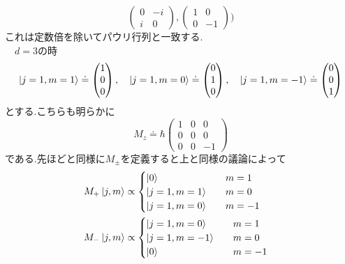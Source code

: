 \documentclass[uplatex,dvipdfmx, a4paper,11pt]{jsarticle}
\begin{document}
\begin{enumerate}[1.]
\begin{enumerate}[1）]
\begin{equation}
\begin{pmatrix}
            0&-i\\i&0
        \end{pmatrix},\begin{pmatrix}
            1&0\\0&-1
        \end{pmatrix})
    \end{equation}
    これは定数倍を除いてパウリ行列と一致する.\vspace{5mm}\\
    　$d=3$の時
    \begin{equation}
        \ket{j=1,m=1}\doteq \begin{pmatrix}
            1\\0\\0
        \end{pmatrix},\quad
        \ket{j=1,m=0}\doteq \begin{pmatrix}
            0\\1\\0
        \end{pmatrix},\quad
        \ket{j=1,m=-1}\doteq \begin{pmatrix}
            0\\0\\1
        \end{pmatrix}
    \end{equation}
    とする.こちらも明らかに
    \begin{equation}
        M_z\doteq \hbar\begin{pmatrix}
            1&0&0\\
            0&0&0\\
            0&0&-1
        \end{pmatrix}
    \end{equation}
    である.先ほどと同様に$M_{\pm}$を定義すると上と同様の議論によって
    \begin{align*}
        M_{+}\ket{j,m}&\propto \begin{cases}
            \ket{0}&\qq{$m=1$}\\
            \ket{j=1,m=1}&\qq{$m=0$}\\
            \ket{j=1, m=0}&\qq{$m=-1$}
        \end{cases}\\
        M_{-}\ket{j,m}&\propto \begin{cases}
            \ket{j=1,m=0}&\qq{$m=1$}\\
            \ket{j=1,m=-1}&\qq{$m=0$}\\
            \ket{0}&\qq{$m=-1$}

\end{cases}
\end{align*}
\end{enumerate}
\end{enumerate}
\end{document}
